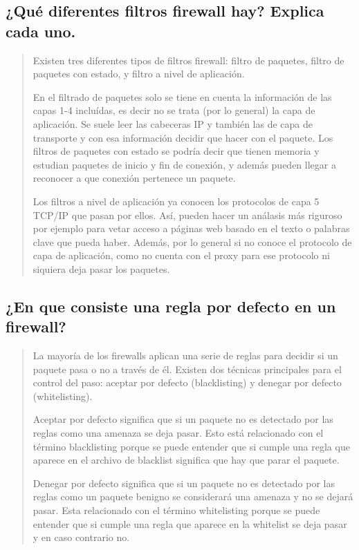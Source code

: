 \documentclass[11pt]{article}
\begin{document}
\subsection{¿Qué diferentes filtros firewall hay? Explica cada uno.}
\label{sec:org50dc6ac}
\begin{quote}
Existen tres diferentes tipos de filtros firewall: filtro de paquetes, filtro de paquetes con estado, y filtro a nivel de aplicación.

En el filtrado de paquetes solo se tiene en cuenta la información de las capas 1-4 incluídas, es decir no se trata (por lo general) la capa de aplicación. Se suele leer las cabeceras IP y también las de capa de transporte y con esa información decidir que hacer con el paquete.
Los filtros de paquetes con estado se podría decir que tienen \guillemotleft{}memoria\guillemotright{} y estudian paquetes de inicio y fin de conexión, y además pueden llegar a reconocer a que conexión pertenece un paquete.

Los filtros a nivel de aplicación ya conocen los protocolos de capa 5 TCP/IP que pasan por ellos. Así, pueden hacer un análasis más riguroso por ejemplo para vetar acceso a páginas web basado en el texto o palabras clave que pueda haber. Además, por lo general si no conoce el protocolo de capa de aplicación, como no cuenta con el \guillemotleft{}proxy\guillemotright{} para ese protocolo ni siquiera deja pasar los paquetes.
\end{quote}
\subsection{¿En que consiste una regla por defecto en un firewall?}
\label{sec:org4d3aaf6}
\begin{quote}
La mayoría de los firewalls aplican una serie de reglas para decidir si un paquete pasa o no a través de él. Existen dos técnicas principales para el control del paso: aceptar por defecto (blacklisting) y denegar por defecto (whitelisting).

Aceptar por defecto significa que si un paquete no es detectado por las reglas como una \guillemotleft{}amenaza\guillemotright{} se deja pasar. Esto está relacionado con el término blacklisting porque se puede entender que si cumple una regla que aparece en el archivo de \guillemotleft{}blacklist\guillemotright{} significa que hay que parar el paquete.

Denegar por defecto significa que si un paquete no es detectado por las reglas como un paquete \guillemotleft{}benigno\guillemotright{} se considerará una amenaza y no se dejará pasar. Esta relacionado con el término whitelisting porque se puede entender que si cumple una regla que aparece en la \guillemotleft{}whitelist\guillemotright{} se deja pasar y en caso contrario no.
\end{quote}
\end{document}
